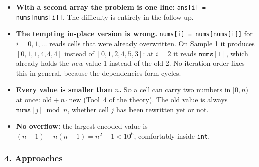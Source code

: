 \begin{itemize}[leftmargin=*]
    \item \textbf{With a second array the problem is one line:} \texttt{ans[i] = nums[nums[i]]}. The difficulty is entirely in the follow-up.
    \item \textbf{The tempting in-place version is wrong.} \texttt{nums[i] = nums[nums[i]]} for $i = 0, 1, \dots$ reads cells that were already overwritten. On Sample 1 it produces $[0,1,1,4,4,4]$ instead of $[0,1,2,4,5,3]$: at $i = 2$ it reads $\texttt{nums}[1]$, which already holds the \emph{new} value 1 instead of the old 2. No iteration order fixes this in general, because the dependencies form cycles.
    \item \textbf{Every value is smaller than $n$.} So a cell can carry two numbers in $[0, n)$ at once: $\text{old} + n \cdot \text{new}$ (Tool~4 of the theory). The old value is always $\texttt{nums}[j] \bmod n$, whether cell $j$ has been rewritten yet or not.
    \item \textbf{No overflow:} the largest encoded value is $(n-1) + n(n-1) = n^2 - 1 < 10^6$, comfortably inside \texttt{int}.
\end{itemize}

\begin{diagrambox}
\end{diagrambox}

\subsubsection*{4. Approaches}

